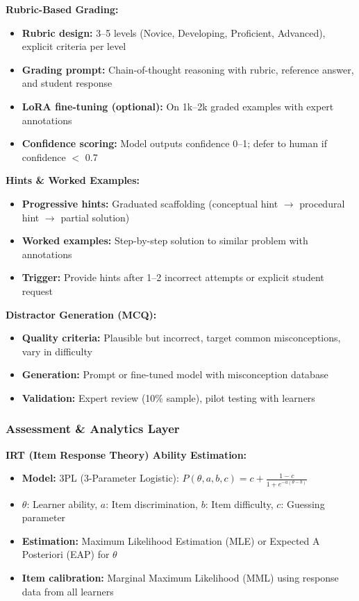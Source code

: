 \documentclass[11pt,letterpaper]{article}
\begin{document}
\textbf{Rubric-Based Grading:}
\begin{itemize}
\item \textbf{Rubric design:} 3--5 levels (Novice, Developing, Proficient, Advanced), explicit criteria per level
\item \textbf{Grading prompt:} Chain-of-thought reasoning with rubric, reference answer, and student response
\item \textbf{LoRA fine-tuning (optional):} On 1k--2k graded examples with expert annotations
\item \textbf{Confidence scoring:} Model outputs confidence 0--1; defer to human if confidence $<$ 0.7
\end{itemize}

\textbf{Hints \& Worked Examples:}
\begin{itemize}
\item \textbf{Progressive hints:} Graduated scaffolding (conceptual hint $\rightarrow$ procedural hint $\rightarrow$ partial solution)
\item \textbf{Worked examples:} Step-by-step solution to similar problem with annotations
\item \textbf{Trigger:} Provide hints after 1--2 incorrect attempts or explicit student request
\end{itemize}

\textbf{Distractor Generation (MCQ):}
\begin{itemize}
\item \textbf{Quality criteria:} Plausible but incorrect, target common misconceptions, vary in difficulty
\item \textbf{Generation:} Prompt or fine-tuned model with misconception database
\item \textbf{Validation:} Expert review (10\% sample), pilot testing with learners
\end{itemize}

\subsubsection{Assessment \& Analytics Layer}

\textbf{IRT (Item Response Theory) Ability Estimation:}
\begin{itemize}
\item \textbf{Model:} 3PL (3-Parameter Logistic): $P(\theta, a, b, c) = c + \frac{1-c}{1 + e^{-a(\theta - b)}}$
\item $\theta$: Learner ability, $a$: Item discrimination, $b$: Item difficulty, $c$: Guessing parameter
\item \textbf{Estimation:} Maximum Likelihood Estimation (MLE) or Expected A Posteriori (EAP) for $\theta$
\item \textbf{Item calibration:} Marginal Maximum Likelihood (MML) using response data from all learners
\end{itemize}
\end{document}
